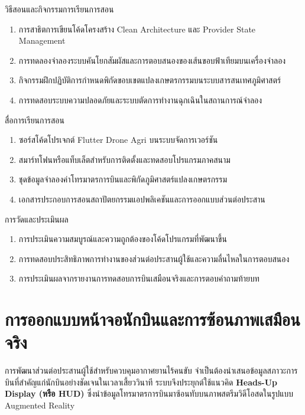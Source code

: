 \begin{planbox}{วิธีสอนและกิจกรรมการเรียนการสอน}
\begin{enumerate}
    \item การสาธิตการเขียนโค้ดโครงสร้าง Clean Architecture และ Provider State Management
    \item การทดลองจำลองระบบคันโยกสัมผัสและการตอบสนองของเส้นขอบฟ้าเทียมบนเครื่องจำลอง
    \item กิจกรรมฝึกปฏิบัติการกำหนดพิกัดขอบเขตแปลงเกษตรกรรมบนระบบสารสนเทศภูมิศาสตร์
    \item การทดสอบระบบความปลอดภัยและระบบตัดการทำงานฉุกเฉินในสถานการณ์จำลอง
\end{enumerate}
\end{planbox}

\begin{planbox}{สื่อการเรียนการสอน}
\begin{enumerate}
    \item ซอร์สโค้ดโปรเจกต์ Flutter Drone Agri บนระบบจัดการเวอร์ชัน
    \item สมาร์ทโฟนหรือแท็บเล็ตสำหรับการติดตั้งและทดสอบโปรแกรมภาคสนาม
    \item ชุดข้อมูลจำลองค่าโทรมาตรการบินและพิกัดภูมิศาสตร์แปลงเกษตรกรรม
    \item เอกสารประกอบการสอนสถาปัตยกรรมแอปพลิเคชันและการออกแบบส่วนต่อประสาน
\end{enumerate}
\end{planbox}

\begin{planbox}{การวัดและประเมินผล}
\begin{enumerate}
    \item การประเมินความสมบูรณ์และความถูกต้องของโค้ดโปรแกรมที่พัฒนาขึ้น
    \item การทดสอบประสิทธิภาพการทำงานของส่วนต่อประสานผู้ใช้และความลื่นไหลในการตอบสนอง
    \item การประเมินผลจากรายงานการทดสอบการบินเสมือนจริงและการตอบคำถามท้ายบท
\end{enumerate}
\end{planbox}

\clearpage

\section{การออกแบบหน้าจอนักบินและการซ้อนภาพเสมือนจริง}

การพัฒนาส่วนต่อประสานผู้ใช้สำหรับควบคุมอากาศยานไร้คนขับ จำเป็นต้องนำเสนอข้อมูลสภาวะการบินที่สำคัญแก่นักบินอย่างชัดเจนในเวลาเสี้ยววินาที ระบบจึงประยุกต์ใช้แนวคิด \textbf{Heads-Up Display (หรือ HUD)} ซึ่งนำข้อมูลโทรมาตรการบินมาซ้อนทับบนภาพสตรีมวิดีโอสดในรูปแบบ Augmented Reality

